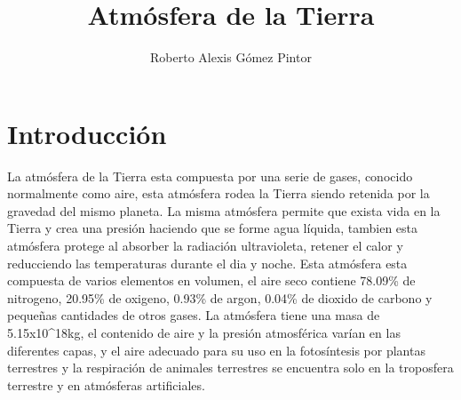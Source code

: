 \documentclass{article}
\title{Atmósfera de la Tierra}
\author{Roberto Alexis Gómez Pintor}
\begin{document}
\maketitle
\section{Introducción}
La atmósfera de la Tierra  esta compuesta por una serie de gases, conocido normalmente como aire, esta atmósfera rodea la Tierra siendo retenida por la gravedad del mismo planeta. La misma atmósfera permite que exista vida en la Tierra y crea una presión haciendo que se forme agua líquida, tambien esta atmósfera protege al absorber la radiación ultravioleta, retener el calor y reducciendo las temperaturas durante el dia y noche. Esta atmósfera esta compuesta de varios elementos en volumen, el aire seco contiene 78.09\% de nitrogeno, 20.95\% de oxigeno, 0.93\% de argon, 0.04\% de dioxido de carbono y pequeñas cantidades de otros gases. La atmósfera tiene una masa de 5.15x10\textasciicircum{18}kg, el contenido de aire y la presión atmosférica varían en las diferentes capas, y el aire adecuado para su uso en la fotosíntesis por plantas terrestres y la respiración de animales terrestres se encuentra solo en la troposfera terrestre y en atmósferas artificiales.
\end{document}
